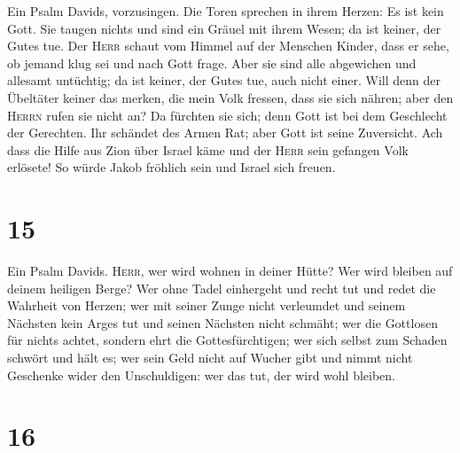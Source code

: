  Ein Psalm Davids, vorzusingen. Die Toren sprechen in
ihrem Herzen: Es ist kein Gott. Sie taugen nichts und sind ein Gräuel
mit ihrem Wesen; da ist keiner, der Gutes tue.  Der
\textsc{Herr} schaut vom Himmel auf der Menschen Kinder, dass er sehe,
ob jemand klug sei und nach Gott frage.  Aber sie sind
alle abgewichen und allesamt untüchtig; da ist keiner, der Gutes tue,
auch nicht einer.  Will denn der Übeltäter keiner das
merken, die mein Volk fressen, dass sie sich nähren; aber den
\textsc{Herrn} rufen sie nicht an?  Da fürchten sie sich;
denn Gott ist bei dem Geschlecht der Gerechten.  Ihr
schändet des Armen Rat; aber Gott ist seine Zuversicht. 
Ach dass die Hilfe aus Zion über Israel käme und der \textsc{Herr} sein
gefangen Volk erlösete! So würde Jakob fröhlich sein und Israel sich
freuen.

\hypertarget{section-14}{%
\section{15}\label{section-14}}

 Ein Psalm Davids. \textsc{Herr}, wer wird wohnen in
deiner Hütte? Wer wird bleiben auf deinem heiligen Berge? 
Wer ohne Tadel einhergeht und recht tut und redet die Wahrheit von
Herzen;  wer mit seiner Zunge nicht verleumdet und seinem
Nächsten kein Arges tut und seinen Nächsten nicht schmäht;
 wer die Gottlosen für nichts achtet, sondern ehrt die
Gottesfürchtigen; wer sich selbst zum Schaden schwört und hält es;
 wer sein Geld nicht auf Wucher gibt und nimmt nicht
Geschenke wider den Unschuldigen: wer das tut, der wird wohl bleiben.

\hypertarget{section-15}{%
\section{16}\label{section-15}}

